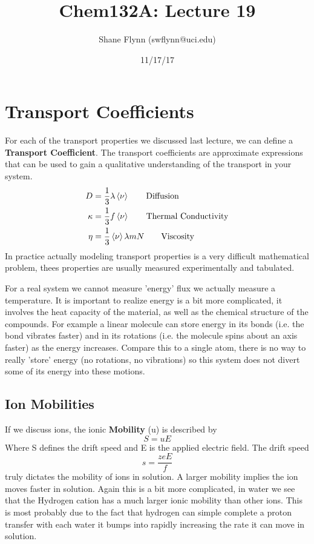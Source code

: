 \documentclass{article}
\title{Chem132A: Lecture 19}
\author{Shane Flynn (swflynn@uci.edu)}
\date{11/17/17}
\newcommand{\be}{\begin{equation}}
\newcommand{\ee}{\end{equation}}
\begin{document}
\maketitle

\section*{Transport Coefficients}
For each of the transport properties we discussed last lecture, we can define a \textbf{Transport Coefficient}.
The transport coefficients are approximate expressions that can be used to gain a qualitative understanding of the transport in your system. 
\be
\begin{split}
D &= \frac{1}{3}\lambda \braket{\nu} \qquad \text{Diffusion}\\
\kappa &= \frac{1}{3}f\braket{\nu} \qquad \text{Thermal Conductivity}\\
\eta &= \frac{1}{3} \braket{\nu} \lambda mN \qquad \text{Viscosity}
\end{split}
\ee
In practice actually modeling transport properties is a very difficult mathematical problem, thees properties are usually measured experimentally and tabulated. 

For a real system we cannot measure 'energy' flux we actually measure a temperature.
It is important to realize energy is a bit more complicated, it involves the heat capacity of the material, as well as the chemical structure of the compounds. 
For example a linear molecule can store energy in its bonds (i.e. the bond vibrates faster) and in its rotations (i.e. the molecule spins about an axis faster) as the energy increases.
Compare this to a single atom, there is no way to really 'store' energy (no rotations, no vibrations) so this system does not divert some of its energy into these motions. 

\subsection*{Ion Mobilities}
If we discuss ions, the ionic \textbf{Mobility} (u) is described by
\be 
S = uE
\ee
Where S defines the drift speed and E is the applied electric field. 
The drift speed
\be
s = \frac{zeE}{f}
\ee
truly dictates the mobility of ions in solution. 
A larger mobility implies the ion moves faster in solution.
Again this is a bit more complicated, in water we see that the Hydrogen cation has a much larger ionic mobility than other ions.
This is most probably due to the fact that hydrogen can simple complete a proton transfer with each water it bumps into rapidly increasing the rate it can move in solution. 
\end{document}
